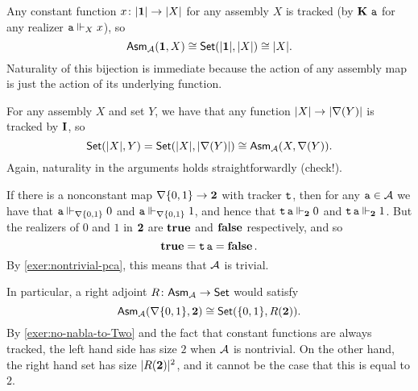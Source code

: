 

Any constant function \(x \colon \carrier{\One} \to \carrier{X}\) for any
assembly \(X\) is tracked (by \(\kcomb\,\pca{a}\) for any realizer
\(\pca{a} \realizes_X x\)), so
\[ \Asm\AA(\One, X) \cong \Set(\carrier{\One},\carrier{X}) \cong \carrier{X}. \]
Naturality of this bijection is immediate because the action of any assembly map
is just the action of its underlying function.




For any assembly \(X\) and set \(Y\), we have that any function
\(\carrier{X} \to \carrier{\nabla(Y)}\) is tracked by \(\icomb\), so
\[ \Set(\carrier{X},Y) = \Set(\carrier{X},\carrier{\nabla(Y)}) \cong \Asm\AA(X,\nabla(Y)). \]
Again, naturality in the arguments holds straightforwardly (check!).




\newcommand{\natwo}{\nabla\{0,1\}}

If there is a nonconstant map \(\natwo \to \Two\) with tracker \(\pca t\), then
for any \(\pca a \in \AA\) we have that
\(\pca a \realizes_{\natwo} 0\) and
\(\pca a \realizes_{\natwo} 1\), and hence that
\(\pca t \pca a \realizes_{\Two} 0\) and
\(\pca t \pca a \realizes_{\Two} 1\).
But the realizers of \(0\) and \(1\) in \(\Two\) are \(\pcatrue\) and
\(\pcafalse\) respectively, and so
\[ \pcatrue = \pca t \pca a = \pcafalse. \]
By \cref{exer:nontrivial-pca}, this means that \(\AA\) is trivial.




In particular, a right adjoint \(R \colon \Asm\AA \to \Set\) would satisfy
\[ \Asm\AA(\natwo, \Two) \cong \Set(\{0,1\}, R(\Two)). \]
By \cref{exer:no-nabla-to-Two} and the fact that constant functions are always
tracked, the left hand side has size \(2\) when \(\AA\) is nontrivial.
On the other hand, the right hand set has size \(\lvert R(\Two)\rvert^2\), and
it cannot be the case that this is equal to \(2\).




